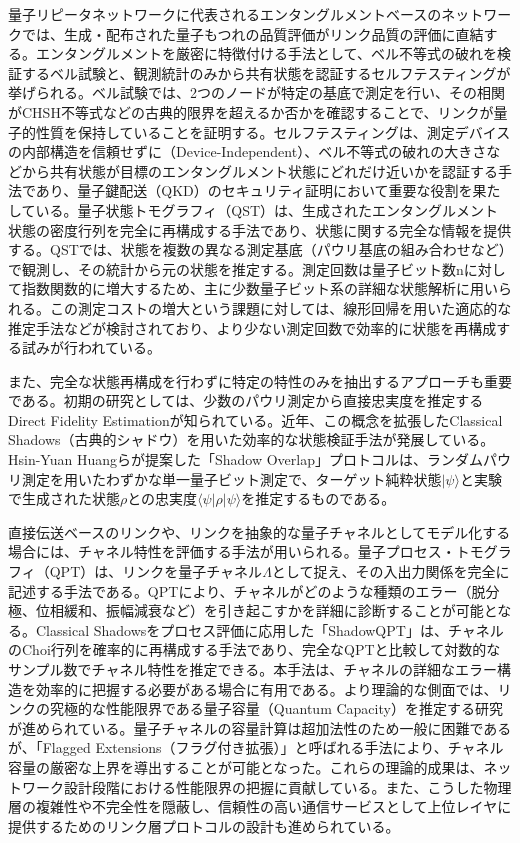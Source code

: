 \documentclass[12pt,a4paper,titlepage,dvipdfmx]{article}
\begin{document}
量子リピータネットワークに代表されるエンタングルメントベースのネットワークでは、生成・配布された量子もつれの品質評価がリンク品質の評価に直結する。エンタングルメントを厳密に特徴付ける手法として、ベル不等式の破れを検証するベル試験と、観測統計のみから共有状態を認証するセルフテスティングが挙げられる。ベル試験では、2つのノードが特定の基底で測定を行い、その相関がCHSH不等式などの古典的限界を超えるか否かを確認することで、リンクが量子的性質を保持していることを証明する\cite{clauser1969proposed}。セルフテスティングは、測定デバイスの内部構造を信頼せずに（Device-Independent）、ベル不等式の破れの大きさなどから共有状態が目標のエンタングルメント状態にどれだけ近いかを認証する手法であり\cite{mayers2004self}、量子鍵配送（QKD）のセキュリティ証明において重要な役割を果たしている。量子状態トモグラフィ（QST）は、生成されたエンタングルメント状態の密度行列を完全に再構成する手法であり、状態に関する完全な情報を提供する\cite{james2001measurement}。QSTでは、状態を複数の異なる測定基底（パウリ基底の組み合わせなど）で観測し、その統計から元の状態を推定する。測定回数は量子ビット数nに対して指数関数的に増大するため、主に少数量子ビット系の詳細な状態解析に用いられる\cite{haffner2005scalable}。この測定コストの増大という課題に対しては、線形回帰を用いた適応的な推定手法などが検討されており、より少ない測定回数で効率的に状態を再構成する試みが行われている\cite{qi2017adaptive, mu2020quantum}。

また、完全な状態再構成を行わずに特定の特性のみを抽出するアプローチも重要である。初期の研究としては、少数のパウリ測定から直接忠実度を推定するDirect Fidelity Estimation\cite{flammia2011direct}が知られている。近年、この概念を拡張したClassical Shadows（古典的シャドウ）を用いた効率的な状態検証手法が発展している。Hsin-Yuan Huangらが提案した「Shadow Overlap」プロトコル\cite{huang2020predicting}は、ランダムパウリ測定を用いたわずかな単一量子ビット測定で、ターゲット純粋状態$|\psi\rangle$と実験で生成された状態$\rho$との忠実度$\langle\psi|\rho|\psi\rangle$を推定するものである。

直接伝送ベースのリンクや、リンクを抽象的な量子チャネルとしてモデル化する場合には、チャネル特性を評価する手法が用いられる。量子プロセス・トモグラフィ（QPT）は、リンクを量子チャネル$\Lambda$として捉え、その入出力関係を完全に記述する手法である\cite{chuang1997prescription}。QPTにより、チャネルがどのような種類のエラー（脱分極、位相緩和、振幅減衰など）を引き起こすかを詳細に診断することが可能となる。Classical Shadowsをプロセス評価に応用した「ShadowQPT」は、チャネルのChoi行列を確率的に再構成する手法であり、完全なQPTと比較して対数的なサンプル数でチャネル特性を推定できる\cite{levy2024classical}。本手法は、チャネルの詳細なエラー構造を効率的に把握する必要がある場合に有用である。より理論的な側面では、リンクの究極的な性能限界である量子容量（Quantum Capacity）を推定する研究が進められている。量子チャネルの容量計算は超加法性のため一般に困難であるが、「Flagged Extensions（フラグ付き拡張）」と呼ばれる手法により、チャネル容量の厳密な上界を導出することが可能となった\cite{kianvash2022bounding}。これらの理論的成果は、ネットワーク設計段階における性能限界の把握に貢献している。また、こうした物理層の複雑性や不完全性を隠蔽し、信頼性の高い通信サービスとして上位レイヤに提供するためのリンク層プロトコルの設計も進められている\cite{dahlberg2019link}。
\end{document}
